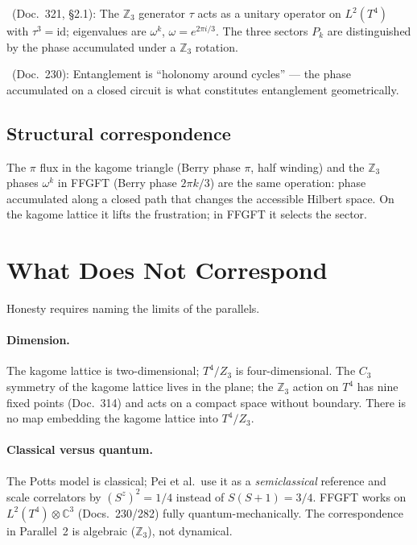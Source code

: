 \BM\ (Doc.~321, §2.1): The $\mathbb{Z}_3$ generator $\tau$ acts as a
unitary operator on $L^2(T^4)$ with $\tau^3=\mathrm{id}$; eigenvalues are
$\omega^k$, $\omega=e^{2\pi i/3}$. The three sectors $P_k$ are distinguished
by the phase accumulated under a $\mathbb{Z}_3$ rotation.

\BM\ (Doc.~230): Entanglement is ``holonomy around cycles'' --- the phase
accumulated on a closed circuit is what constitutes entanglement
geometrically.

\subsection{Structural correspondence}

The $\pi$ flux in the kagome triangle (Berry phase $\pi$, half winding) and
the $\mathbb{Z}_3$ phases $\omega^k$ in FFGFT (Berry phase $2\pi k/3$) are
the same operation: phase accumulated along a closed path that changes the
accessible Hilbert space. On the kagome lattice it lifts the frustration; in
FFGFT it selects the sector. \SM

\section{What Does Not Correspond}

Honesty requires naming the limits of the parallels.

\paragraph{Dimension.} The kagome lattice is two-dimensional; $T^4/Z_3$ is
four-dimensional. The $C_3$ symmetry of the kagome lattice lives in the
plane; the $\mathbb{Z}_3$ action on $T^4$ has nine fixed points (Doc.~314)
and acts on a compact space without boundary. There is no map embedding the
kagome lattice into $T^4/Z_3$.

\paragraph{Classical versus quantum.} The Potts model is classical; Pei et
al.\ use it as a \emph{semiclassical} reference and scale correlators by
$(S^z)^2=1/4$ instead of $S(S+1)=3/4$. FFGFT works on
$L^2(T^4)\otimes\mathbb{C}^3$ (Docs.~230/282) fully quantum-mechanically.
The correspondence in Parallel~2 is algebraic ($\mathbb{Z}_3$), not
dynamical.

